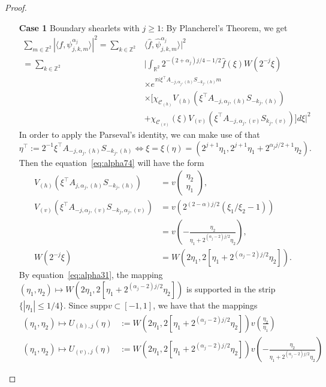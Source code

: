 \begin{proof}
\begin{itemize}
\begin{enumerate}
\item[\textbf{Case 1}] Boundary shearlets with $j\geq 1$: By Plancherel's Theorem, we get
\begin{equation}
\label{eq:alpha74}
\begin{aligned}
\sum_{m\in\mathbb{Z}^2} |\langle f,\psi_{j,k,m}^{\alpha_j}\rangle|^2=\sum_{k\in\mathbb{Z}^2}&\langle \hat{f},\hat{\psi}_{j,k,m}^{\alpha_j}\rangle |^2\\ 
= \sum_{k\in\mathbb{Z}^2}&\bigg|\int_{\mathbb{R}^2}2^{-(2+\alpha_j)j/4-1/2}\hat{f}(\xi)W(2^{-j}\xi)\\
&\times e^{\pi i\xi^{\top}A_{-j,\alpha_j,(h)}S_{-k_j,(h)}m}
\\
&\times[\chi_{\mathcal{C}_{(h)}}V_{(h)}(\xi^{\top}A_{-j,\alpha_j,(h)}S_{-k_j,(h)})\\
&+\chi_{\mathcal{C}_{(v)}}(\xi)V_{(v)}(\xi^{\top}A_{-j,\alpha_j,(v)}S_{k_j,(v)})]d\xi\bigg|^2
\end{aligned}
\end{equation}
In order to apply the Parseval's identity, we can make use of that
$$
\eta^{\top}:=2^{-1}\xi^{\top}A_{-j,\alpha_{j},(h)}S_{-k_j,(h)}\Leftrightarrow \xi=\xi(\eta)=(2^{j+1}\eta_1,2^{j+1}\eta_1+2^{\alpha_j j/2+1}\eta_2).
$$
Then the equation~\ref{eq:alpha74} will have the form
$$
\begin{aligned}
V_{(h)}\left(\xi^{\top}A_{j,\alpha_j,(h)}S_{-k_j,(h)}\right)&=v\left(\begin{matrix}\eta_2\\ \eta_1\end{matrix}\right),\\
V_{(v)}\left(\xi^{\top}A_{-j,\alpha_j,(v)}S_{-k_j,\alpha_j,(v)}\right)&=v\left(2^{(2-\alpha)j/2}(\xi_1/\xi_2-1)\right)\\
 &= v\left(-\frac{\eta_2}{\eta_1+2^{(\alpha_j-2)j/2}\eta_2}\right),\\
W(2^{-j}\xi)&=W\left(2\eta_1,2[\eta_1+2^{(\alpha_j-2)j/2}\eta_2]\right).
\end{aligned}
$$
By equation~\ref{eq:alpha31}, the mapping $(\eta_1,\eta_2)\mapsto W(2\eta_1,2[\eta_1+2^{(\alpha_j-2)j/2}\eta_2])$ is supported in the strip $\{|\eta_1|\leq 1/4\}$. Since $\text{supp}v\subset [-1,1]$, we have that the mappings
$$
\begin{aligned}
(\eta_1,\eta_2)\mapsto U_{(h),j}(\eta)&:=W(2\eta_1,2[\eta_1+2^{(\alpha_j-2)j/2}\eta_2])v\left(\frac{\eta_2}{\eta_1}\right)\\
(\eta_1,\eta_2)\mapsto U_{(v),j}(\eta)&:=W(2\eta_1,2[\eta_1+2^{(\alpha_j-2)j/2}\eta_2])v\left(-\frac{\eta_2}{\eta_1+2^{(\alpha_j-2)j/2}\eta_2}\right)

\end{aligned}$$
\end{enumerate}
\end{itemize}
\end{proof}
